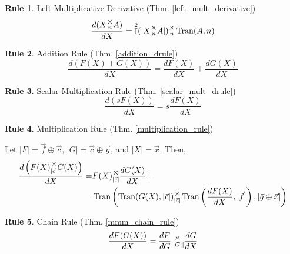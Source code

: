 \documentclass[12pt]{book}
\theoremstyle{plain}
\theoremstyle{definition}
\newtheorem{drule}{Rule}
\theoremstyle{ppart}
\theoremstyle{case}
\theoremstyle{solution}
\DeclareMathOperator{\Ident}{I}
\DeclareMathOperator{\Tran}{Tran}
\newcommand{\mmult}[1]{\text{\raisebox{1ex}{$\underset{#1}{\times}$}}}
\begin{document}
\begin{appendices}
\begin{drule}
Left Multiplicative Derivative
(Thm. \ref{left_mult_derivative})
\[ \frac{d(X \mmult{n} A)}{dX} = \Ident^2(|X \mmult{n} A|) \mmult{n} \Tran(A, n) \]
\end{drule}

\begin{drule}
Addition Rule
(Thm. \ref{addition_drule})
\[ \frac{d(F(X) + G(X))}{dX} = \frac{dF(X)}{dX} + \frac{dG(X)}{dX} \]
\end{drule}

\begin{drule}
Scalar Multiplication Rule
(Thm. \ref{scalar_mult_drule})
\[ \frac{d(sF(X))}{dX} = s\frac{dF(X)}{dX} \]
\end{drule}

\begin{drule}
Multiplication Rule
(Thm. \ref{multiplication_rule})

Let $|F| = \vec{f} \oplus \vec{c}$, $|G| = \vec{c} \oplus \vec{g}$,
and $|X| = \vec{x}$. Then,
\begin{align*}
 \frac{d\left(F(X) \mmult{|\vec{c}|} G(X)\right)}{dX} =&
 F(X) \mmult{|\vec{c}|} \frac{dG(X)}{dX} + \\
 &\Tran\left(
   \Tran(G(X), |\vec{c}|)
     \mmult{|\vec{c}|}
   \Tran\left(\frac{dF(X)}{dX}, |\vec{f}|\right),
   |\vec{g} \oplus \vec{x}|
 \right)
\end{align*}
\end{drule}

\begin{drule}
Chain Rule
(Thm. \ref{mmm_chain_rule})
\[ \frac{dF(G(X))}{dX} = \frac{dF}{dG} \mmult{||G||} \frac{dG}{dX} \]
\end{drule}

\end{appendices}



\end{document}
